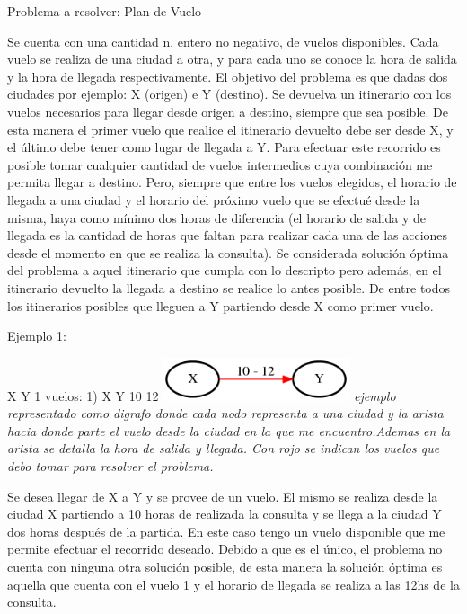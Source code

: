 \documentclass[a4paper]{article}
\begin{document}
{\noindent \Huge Problema a resolver: Plan de Vuelo}\newline  \newline

Se cuenta con una cantidad n, entero no negativo, de vuelos disponibles. Cada vuelo se realiza de una ciudad a otra, y para cada uno se conoce la hora de salida y la hora de llegada respectivamente.
 El objetivo del problema es que dadas dos ciudades por ejemplo: X (origen) e  Y (destino).  Se devuelva un itinerario con los vuelos necesarios para llegar desde origen a destino, siempre que sea posible.  De esta manera el primer vuelo que realice el itinerario devuelto debe ser desde X, y el último debe tener como lugar de llegada a Y. Para efectuar este recorrido es posible tomar cualquier cantidad de vuelos intermedios cuya combinación me permita llegar a destino. Pero, siempre que entre los vuelos elegidos, el horario de  llegada a una ciudad y el horario del próximo vuelo que se efectué  desde la misma, haya como mínimo dos horas de diferencia (el horario de salida y de llegada es la cantidad de horas que faltan para realizar cada una de las acciones desde el momento en que se realiza la consulta). 
Se considerada solución óptima del problema a aquel itinerario que cumpla con lo descripto pero además, en el itinerario devuelto la llegada a destino se realice lo antes posible. De entre todos los itinerarios posibles que lleguen a Y partiendo desde X como primer vuelo.\newline

Ejemplo 1:

X Y 1
vuelos:
1) X Y 10 12\newline
\vspace{1cm}
\includegraphics[width=\textwidth,height=0.5in,keepaspectratio
]{ejemplo1.png}\newline
\textit{ejemplo representado como digrafo donde cada nodo representa a una ciudad y la arista hacia donde parte el vuelo desde la ciudad en la que me encuentro.Ademas en la arista se detalla la hora de salida y llegada. Con rojo se indican los vuelos que debo tomar para resolver el problema.} \newline

Se desea llegar de X a Y y se provee de un vuelo. El mismo se realiza desde la ciudad X partiendo a 10 horas de realizada la consulta y se llega a la ciudad Y dos horas después de la partida. En este caso tengo un vuelo disponible que me permite efectuar el recorrido deseado. Debido  a que es el único, el problema no cuenta con ninguna otra solución posible, de esta manera la solución óptima es aquella que cuenta con el vuelo 1 y el horario de llegada se realiza a las 12hs de la consulta.\newline \newline
\end{document}
